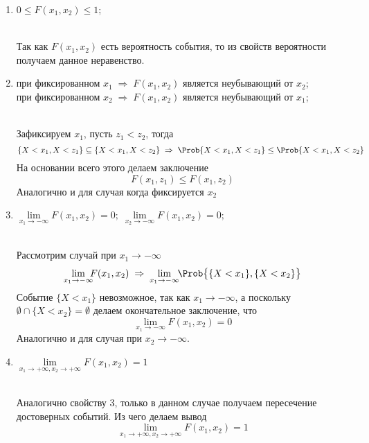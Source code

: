 \begin{enumerate}
	\item $0 \leq F(x_1, x_2) \leq 1$;
	\begin{Proof}\\
		Так как $F(x_1, x_2)$ есть вероятность события, то из свойств вероятности получаем данное неравенство.\\
	\end{Proof}
	
	\item при фиксированном $x_1 \;\Rightarrow\; F(x_1, x_2)$ является неубывающий от $x_2$;\\
	при фиксированном $x_2 \;\Rightarrow\; F(x_1, x_2)$ является неубывающий от $x_1$;
	\begin{Proof}\\
		Зафиксируем $x_1$, пусть $z_1 < z_2$, тогда
		\[
			\{X < x_1, X < z_1\} \subseteq \{X < x_1, X < z_2\} \;\Rightarrow\; \Prob\{X < x_1, X < z_1\} \leq \Prob\{X < x_1, X < z_2\}
		\]
		На основании всего этого делаем заключение
		\[
			F(x_1, z_1) \leq F(x_1, z_2)
		\]
		Аналогично и для случая когда фиксируется $x_2$\\
	\end{Proof}
	
	\item $\lim\limits_{x_1 \to -\infty} \!\!\!F(x_1, x_2) = 0;\; \lim\limits_{x_2 \to -\infty} \!\!\!F(x_1, x_2) = 0;$
	\begin{Proof}\\
		Рассмотрим случай при $x_1 \to -\infty$
		\[
			\lim\limits_{x_1 \to -\infty} \!\!\!F(x_1, x_2) \;\Rightarrow\; \lim\limits_{x_1 \to -\infty} \!\!\Prob\bigl\{ \{X < x_1\}, \{ X < x_2\} \bigr\}
		\]
		Событие $\{ X < x_1 \}$ невозможное, так как $x_1 \to -\infty$, а поскольку\\ $\emptyset \cap \{ X < x_2\} = \emptyset$ делаем окончательное заключение, что
		\[
			\lim\limits_{x_1 \to -\infty} \!\!\!F(x_1, x_2) = 0
		\]
		Аналогично и для случая при $x_2 \to -\infty$.\\
	\end{Proof}
	
	\item $\lim\limits_{x_1 \to +\infty, x_2 \to +\infty}F(x_1, x_2) = 1$
	\begin{Proof}\\
		Аналогично свойству $3$, только в данном случае получаем пересечение достоверных событий. Из чего делаем вывод
		\[
			\lim\limits_{x_1 \to +\infty, x_2 \to +\infty}F(x_1, x_2) = 1
		\]
	\end{Proof}
	

\end{enumerate}
